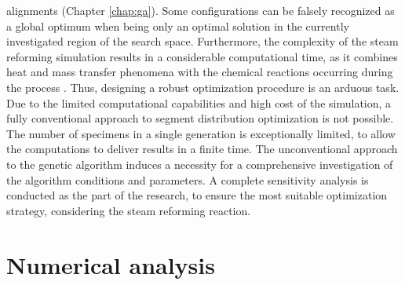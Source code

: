 \documentclass[preprint,12pt]{elsarticle}
\begin{document}
alignments (Chapter \ref{chap:ga}). Some configurations can be falsely recognized as a global optimum when being only an optimal solution in the currently investigated region of the search space. Furthermore, the complexity of the steam reforming simulation results in a considerable computational time, as it combines heat and mass transfer phenomena with the chemical reactions occurring during the process \cite{Brus2012}. Thus, designing a robust optimization procedure is an arduous task. Due to the limited computational capabilities and high cost of the simulation, a fully conventional approach to segment distribution optimization is not possible. The number of specimens in a single generation is exceptionally limited, to allow the computations to deliver results in a finite time. The unconventional approach to the genetic algorithm induces a necessity for a comprehensive investigation of the algorithm conditions and parameters. A complete sensitivity analysis is conducted as the part of the research, to ensure the most suitable optimization strategy, considering the steam reforming reaction.


\clearpage
\section{Numerical analysis}
\label{sec:num_analysis}
\end{document}
